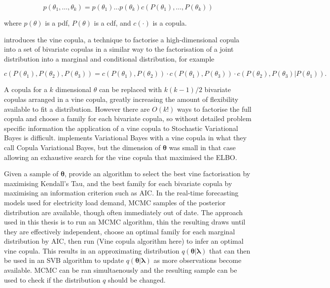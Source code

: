 \documentclass[12pt,a4paper]{article}%
\numberwithin{equation}{section}
\begin{document}
\begin{equation}
\label{vc1}
p(\theta_1, \dots, \theta_k) = p(\theta_1) \dots p(\theta_k) c(P(\theta_1), \dots, P(\theta_k))
\end{equation}

where $p(\theta)$ is a pdf, $P(\theta)$ is a cdf, and $c(\cdot)$ is a copula. 

\citet{Joe1994} introduces the vine copula, a technique to factorise a high-dimensional copula into a set of bivariate copulas in a similar way to the factorisation of a joint distribution into a marginal and conditional distribution, for example

\begin{equation}
\label{vc2}
c(P(\theta_1), P(\theta_2), P(\theta_3)) = c(P(\theta_1), P(\theta_2)) \cdot c(P(\theta_1), P(\theta_3)) \cdot c(P(\theta_2), P(\theta_3) | P(\theta_1)).
\end{equation}

A copula for a $k$ dimensional $\theta$ can be replaced with $k(k-1)/2$ bivariate copulas arranged in a vine copula, greatly increasing the amount of flexibility available to fit a distribution. However there are $O(k!)$ ways to factorise the full copula and choose a family for each bivariate copula, so without detailed problem specific information the application of a vine copula to Stochastic Variational Bayes is difficult. \citet{Tran2015} implements Variational Bayes with a vine copula in what they call Copula Variational Bayes, but the dimension of $\boldsymbol{\theta}$ was small in that case allowing an exhaustive search for the vine copula that maximised the ELBO. 

Given a sample of $\boldsymbol{\theta}$, \citet{Dssmann2013} provide an algorithm to select the best vine factorisation by maximising Kendall's Tau, and the best family for each bivariate copula by maximising an information criterion such as AIC. In the real-time forecasting models used for electricity load demand, MCMC samples of the posterior distribution are available, though often immediately out of date. The approach used in this thesis is to run an MCMC algorithm, thin the resulting draws until they are effectively independent, choose an optimal family for each marginal distribution by AIC, then run (Vine copula algorithm here) to infer an optimal vine copula. This results in an approximating distribution $q(\boldsymbol{\theta} | \boldsymbol{\lambda})$ that can then be used in an SVB algorithm to update $q(\boldsymbol{\theta} | \boldsymbol{\lambda})$ as more observations become available. MCMC can be ran simultaenously and the resulting sample can be used to check if the distribution $q$ should be changed. 
\end{document}
